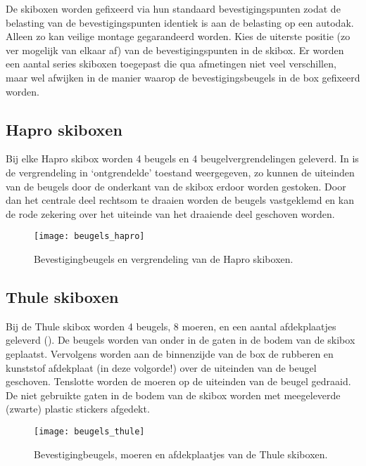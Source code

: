 De skiboxen worden gefixeerd via hun standaard bevestigingspunten zodat
de belasting van de bevestigingspunten identiek is aan de belasting op
een autodak. Alleen zo kan veilige montage gegarandeerd worden. Kies de
uiterste positie (zo ver mogelijk van elkaar af) van de
bevestigingspunten in de skibox. Er worden een aantal series skiboxen
toegepast die qua afmetingen niet veel verschillen, maar wel afwijken in
de manier waarop de bevestigingsbeugels in de box gefixeerd worden.


\subsection{Hapro skiboxen}

Bij elke Hapro skibox worden 4 beugels en 4 beugelvergrendelingen
geleverd. In  is de vergrendeling in
‘ontgrendelde’ toestand weergegeven, zo kunnen de uiteinden van de
beugels door de onderkant van de skibox erdoor worden gestoken. Door dan
het centrale deel rechtsom te draaien worden de beugels vastgeklemd en
kan de rode zekering over het uiteinde van het draaiende deel geschoven
worden.

\begin{figure}
    \centering
    \texttt{[image: beugels\_hapro]}
    \caption{Bevestigingbeugels en vergrendeling van de Hapro skiboxen.}
    \label{fig:beugels_hapro}
\end{figure}


\subsection{Thule skiboxen}

Bij de Thule skibox worden 4 beugels, 8 moeren, en een aantal
afdekplaatjes geleverd (). De beugels worden van onder in de gaten in de
bodem van de skibox geplaatst. Vervolgens worden aan de binnenzijde van
de box de rubberen en kunststof afdekplaat (in deze volgorde!) over de
uiteinden van de beugel geschoven. Tenslotte worden de moeren op de
uiteinden van de beugel gedraaid. De niet gebruikte gaten in de bodem
van de skibox worden met meegeleverde (zwarte) plastic stickers afgedekt.

\begin{figure}
    \centering
    \texttt{[image: beugels\_thule]}
    \caption{Bevestigingbeugels, moeren en afdekplaatjes van de Thule
             skiboxen.}
    \label{fig:beugels_thule}
\end{figure}


